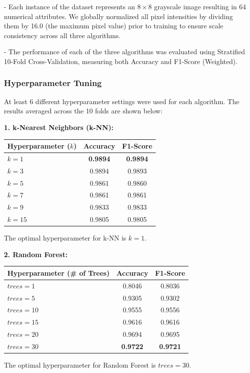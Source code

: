 \documentclass{article}
\begin{document}
- Each instance of the dataset represents an $8 \times 8$ grayscale image resulting in 64 numerical attributes. We globally normalized all pixel intensities by dividing them by 16.0 (the maximum pixel value) prior to training to ensure scale consistency across all three algorithms.

- The performance of each of the three algorithms was evaluated using Stratified 10-Fold Cross-Validation, measuring both Accuracy and F1-Score (Weighted). 

\subsubsection{Hyperparameter Tuning}

At least 6 different hyperparameter settings were used for each algorithm. The results averaged across the 10 folds are shown below:

\textbf{1. k-Nearest Neighbors (k-NN):}
\begin{table}[H]
\centering
\begin{tabular}{|l|c|c|}
\hline
\textbf{Hyperparameter ($k$)} & \textbf{Accuracy} & \textbf{F1-Score} \\ \hline
$k = 1$ & \textbf{0.9894} & \textbf{0.9894} \\ \hline
$k = 3$ & 0.9894 & 0.9893 \\ \hline
$k = 5$ & 0.9861 & 0.9860 \\ \hline
$k = 7$ & 0.9861 & 0.9861 \\ \hline
$k = 9$ & 0.9833 & 0.9833 \\ \hline
$k = 15$ & 0.9805 & 0.9805 \\ \hline
\end{tabular}
\end{table}
\noindent The optimal hyperparameter for k-NN is $k=1$.

\textbf{2. Random Forest:}
\begin{table}[H]
\centering
\begin{tabular}{|l|c|c|}
\hline
\textbf{Hyperparameter (\# of Trees)} & \textbf{Accuracy} & \textbf{F1-Score} \\ \hline
$trees = 1$ & 0.8046 & 0.8036 \\ \hline
$trees = 5$ & 0.9305 & 0.9302 \\ \hline
$trees = 10$ & 0.9555 & 0.9556 \\ \hline
$trees = 15$ & 0.9616 & 0.9616 \\ \hline
$trees = 20$ & 0.9694 & 0.9695 \\ \hline
$trees = 30$ & \textbf{0.9722} & \textbf{0.9721} \\ \hline
\end{tabular}
\end{table}
\noindent The optimal hyperparameter for Random Forest is $trees=30$.
\end{document}
